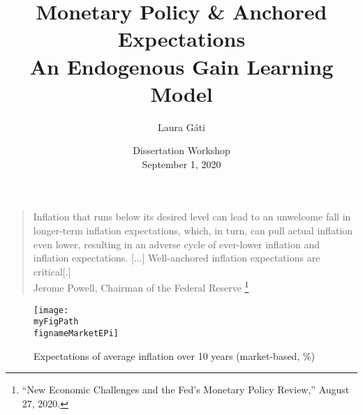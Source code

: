 \documentclass[10pt]{beamer}
\author[]{Laura G\'ati}
\institute[]{Boston College}
\title[]{Monetary Policy \& Anchored Expectations \\
An Endogenous Gain Learning Model}
\date[]{Dissertation Workshop \\ \vspace{0.25cm} September 1, 2020}
\def \myFigPath {../../../figures/}
\def\myTinyFigScale{0.16}
\def\fignameMarketEPi{epi10_2020_06_04}
\begin{document}
\begin{frame}[plain] %

\maketitle

\end{frame}




\begin{frame}\label{motivation}
	
\begin{quote}
Inflation that runs below its desired level can lead to an unwelcome fall in longer-term inflation expectations, which, in turn, can pull actual inflation even lower, resulting in an adverse cycle of ever-lower inflation and inflation expectations.
[...] Well-anchored inflation expectations are critical[.]  \\
Jerome Powell, Chairman of the Federal Reserve \footnote{``New Economic Challenges and the Fed's Monetary Policy Review,''  August 27, 2020.} %
\end{quote}	




\end{frame}

\begin{frame}\label{TIPS}
	

\begin{figure}[h!]
\caption{Expectations of average inflation over 10 years (market-based, \%)}
\texttt{[image: \\myFigPath \\fignameMarketEPi]}
\label{epi}
\end{figure}



\vspace{-0.5cm}
\hfill \hyperlink{app_TIPS}{}
\end{frame}
\end{document}
